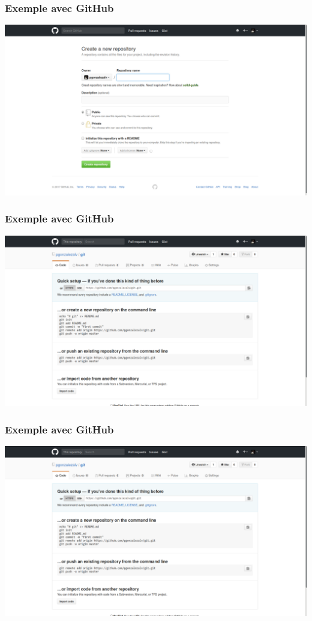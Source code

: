 \documentclass{beamer}
\begin{document}
\begin{frame}[fragile]
\frametitle{Exemple avec GitHub}
  \begin{center}
      \includegraphics[width=\textwidth]{img/github_new_project}
  \end{center}
\end{frame}

\begin{frame}[fragile]
\frametitle{Exemple avec GitHub}
  \begin{center}
      \includegraphics[width=\textwidth]{img/github_new_project_setup}
  \end{center}
\end{frame}

\begin{frame}[fragile]
\frametitle{Exemple avec GitHub}
  \begin{center}
      \includegraphics[width=\textwidth]{img/github_new_project_setup}
  \end{center}
\end{frame}
\end{document}
